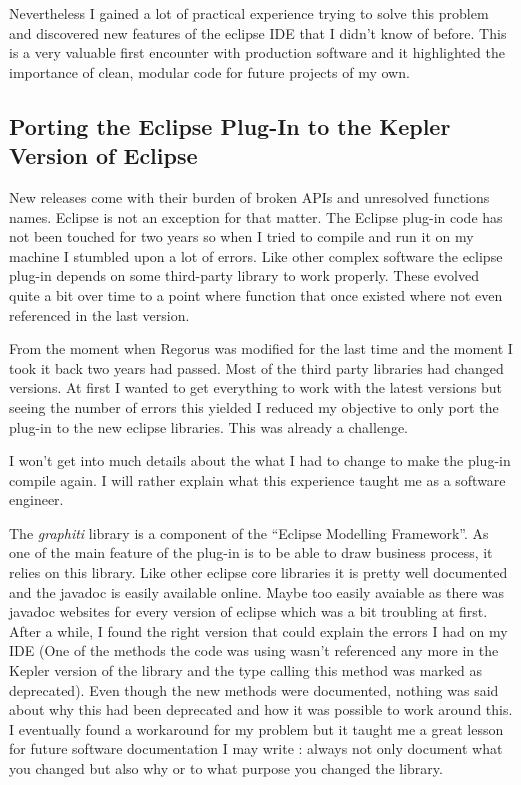 \documentclass[10pt]{report}
\begin{document}
Nevertheless I gained a lot of practical experience trying to solve this problem and discovered new features of the eclipse IDE that I didn't know of before. This is a very valuable first encounter with production software and it highlighted the importance of clean, modular code for future projects of my own.


\subsection{Porting the Eclipse Plug-In to the Kepler Version of Eclipse}

New releases come with their burden of broken APIs and unresolved functions names. Eclipse is not an exception for that matter. The Eclipse plug-in code has not been touched for two years so when I tried to compile and run it on my machine I stumbled upon a lot of errors. Like other complex software the eclipse plug-in depends on some third-party library to work properly. These evolved quite a bit over time to a point where function that once existed where not even referenced in the last version.

From the moment when Regorus was modified for the last time and the moment I took it back two years had passed. Most of the third party libraries had changed versions. At first I wanted to get everything to work with the latest versions but seeing the number of errors this yielded I reduced my objective to only port the plug-in to the new eclipse libraries. This was already a challenge.

I won't get into much details about the what I had to change to make the plug-in compile again. I will rather explain what this experience taught me as a software engineer.

The \textit{graphiti} library is a component of the \enquote{Eclipse Modelling Framework}. As one of the main feature of the plug-in is to be able to draw business process, it relies on this library. Like other eclipse core libraries it is pretty well documented and the javadoc is easily available online. Maybe too easily avaiable as there was javadoc websites for every version of eclipse which was a bit troubling at first. After a while, I found the right version that could explain the errors I had on my IDE (One of the methods the code was using wasn't referenced any more in the Kepler version of the library and the type calling this method was marked as deprecated). Even though the new methods were documented, nothing was said about why this had been deprecated and how it was possible to work around this. I eventually found a workaround for my problem but it taught me a great lesson for future software documentation I may write : always not only document what you changed but also why or to what purpose you changed the library.
\end{document}
